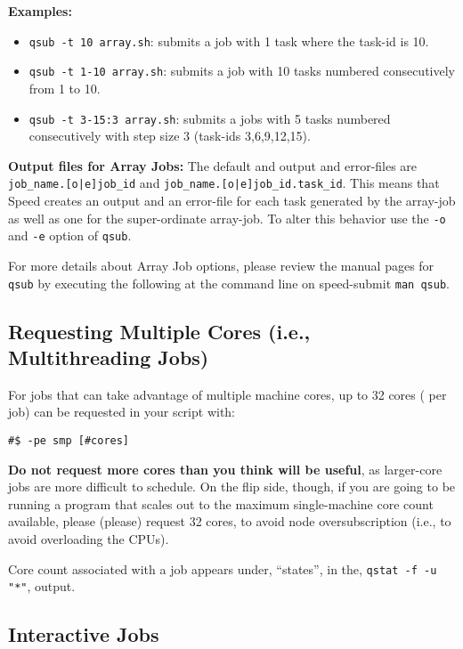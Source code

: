 \documentclass{easychair}
\begin{document}
\textbf{Examples:}
\begin{itemize}
\item
\texttt{qsub -t 10 array.sh}: submits a job with 1 task where the task-id is 10. 
\item
\texttt{qsub -t 1-10 array.sh}: submits a job with 10 tasks numbered consecutively from 1 to 10.
\item
\texttt{qsub -t 3-15:3 array.sh}: submits a jobs with 5 tasks numbered consecutively with step size 3
(task-ids 3,6,9,12,15).
\end{itemize}

\textbf{Output files for Array Jobs:}
The default and output and error-files are \texttt{job_name.[o|e]job_id} and \texttt{job_name.[o|e]job_id.task_id}.
This means that Speed creates an output and an error-file for each task generated by the array-job as well as one
for the super-ordinate array-job. To alter this behavior use the \texttt{-o} and \texttt{-e} option of \texttt{qsub}. 

For more details about Array Job options, please review the manual pages for \texttt{qsub} by executing the following at the command
line on speed-submit \texttt{man qsub}.

\subsection{Requesting Multiple Cores (i.e., Multithreading Jobs)}

For jobs that can take advantage of multiple machine cores, up to 32 cores (
per job) can be requested in your script with: 

\begin{verbatim}
#$ -pe smp [#cores] 
\end{verbatim}

\textbf{Do not request more cores than you think will be useful}, as larger-core
jobs are more difficult to schedule. On the flip side, though, if you 
are going to be running a program that scales out to the maximum single-machine
core count available, please (please) request 32 cores, to avoid node 
oversubscription (i.e., to avoid overloading the CPUs).

Core count associated with a job appears under, ``states'', in the,
\texttt{qstat -f -u "*"}, output.

\subsection{Interactive Jobs}
\end{document}
